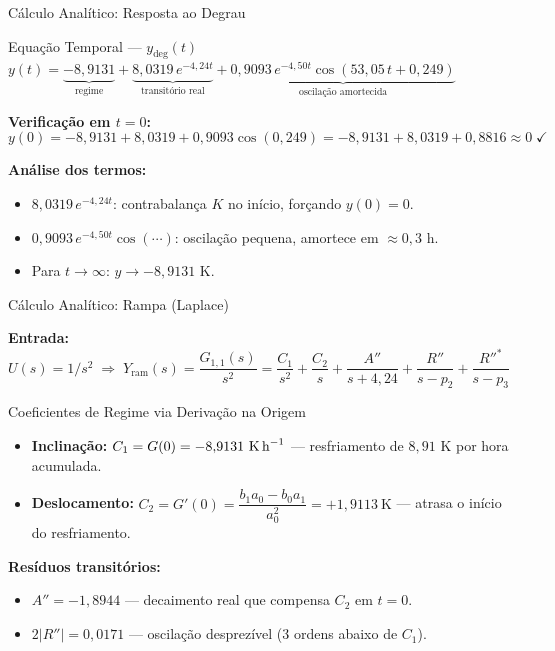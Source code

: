 \begin{frame}{Cálculo Analítico: Resposta ao Degrau}
  \footnotesize

  \begin{alertblock}{Equação Temporal — $y_{\text{deg}}(t)$}
    \centering
    $y(t) = \underbrace{-8{,}9131}_{\text{regime}}
    + \underbrace{8{,}0319\,e^{-4{,}24t}}_{\text{transitório real}}
    + \underbrace{0{,}9093\,e^{-4{,}50t}\cos(53{,}05\,t+0{,}249)}_{\text{oscilação amortecida}}$
  \end{alertblock}

  \textbf{Verificação em $t=0$:}
  \begin{equation*}
    y(0) = -8{,}9131 + 8{,}0319 + 0{,}9093\cos(0{,}249)
    = -8{,}9131 + 8{,}0319 + 0{,}8816 \approx 0 \;\checkmark
  \end{equation*}

  \textbf{Análise dos termos:}
\begin{itemize}\itemsep2pt
    \item $8{,}0319\,e^{-4{,}24t}$: contrabalança $K$ no início, forçando $y(0)=0$.
    \item $0{,}9093\,e^{-4{,}50t}\cos(\cdots)$: oscilação pequena, amortece em
      $\approx 0{,}3$ h.
    \item Para $t\to\infty$: $y\to -8{,}9131$ K. \checkmark
  \end{itemize}

\end{frame}

\begin{frame}{Cálculo Analítico: Rampa (Laplace)}
  \footnotesize

  \textbf{Entrada:} $U(s)=1/s^2 \;\Rightarrow\;
  Y_{\text{ram}}(s) = \dfrac{G_{1,1}(s)}{s^2}
  = \dfrac{C_1}{s^2} + \dfrac{C_2}{s}
  + \dfrac{A''}{s+4{,}24} + \dfrac{R''}{s-p_2} + \dfrac{R''^*}{s-p_3}$

  \begin{block}{Coeficientes de Regime via Derivação na Origem}
    \vspace{-2pt}
  \begin{itemize}\itemsep2pt
      \item \textbf{Inclinação:}\;
        $C_1 = G(0) = -8{,}9131~\text{K\,h}^{-1}$
        \quad — resfriamento de $8{,}91$ K por hora acumulada.
      \item \textbf{Deslocamento:}\;
        $C_2 = G'(0) = \dfrac{b_1 a_0 - b_0 a_1}{a_0^2} = +1{,}9113~\text{K}$
        \quad — atrasa o início do resfriamento.
    \end{itemize}
    \vspace{-2pt}
  \end{block}

  \textbf{Resíduos transitórios:}
\begin{itemize}\itemsep2pt
    \item $A'' = -1{,}8944$ \quad — decaimento real que compensa $C_2$ em $t=0$.
    \item $2|R''| = 0{,}0171$ \quad — oscilação desprezível (3 ordens abaixo de $C_1$).
  \end{itemize}

\end{frame}

